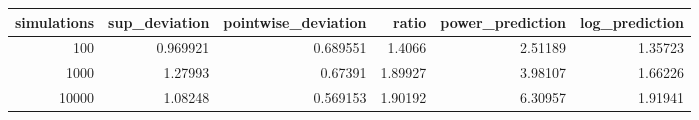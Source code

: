 \begin{tabular}{rrrrrr}
\toprule
simulations & sup_deviation & pointwise_deviation & ratio & power_prediction & log_prediction \\
\midrule
100 & 0.969921 & 0.689551 & 1.4066 & 2.51189 & 1.35723 \\
1000 & 1.27993 & 0.67391 & 1.89927 & 3.98107 & 1.66226 \\
10000 & 1.08248 & 0.569153 & 1.90192 & 6.30957 & 1.91941 \\
\bottomrule
\end{tabular}
